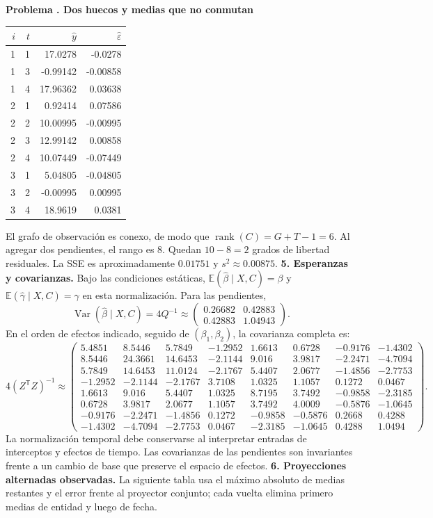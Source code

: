 \documentclass[11pt,a4paper]{article}
\newcommand{\E}{\mathbb E}
\newcommand{\T}{^{\mathsf T}}
\DeclareMathOperator{\Var}{Var}
\DeclareMathOperator{\rank}{rank}
\theoremstyle{definition}
\newcounter{problema}
\newenvironment{resuelto}[1]{\refstepcounter{problema}\par\medskip\Needspace{6\baselineskip}\textbf{Problema \theproblema. #1}\par}{\par\medskip}
\newcommand{\eps}{\varepsilon}
\begin{document}
\begin{resuelto}{Dos huecos y medias que no conmutan}
\begin{center}\small
\begin{tabular}{rrrr}
\toprule
$i$&$t$&$\widehat y$&$\widehat\eps$\\
\midrule
1&1&17.0278&-0.0278\\
1&3&-0.99142&-0.00858\\
1&4&17.96362&0.03638\\
2&1&0.92414&0.07586\\
2&2&10.00995&-0.00995\\
2&3&12.99142&0.00858\\
2&4&10.07449&-0.07449\\
3&1&5.04805&-0.04805\\
3&2&-0.00995&0.00995\\
3&4&18.9619&0.0381\\
\bottomrule
\end{tabular}
\end{center}
El grafo de observación es conexo, de modo que $\rank(C)=G+T-1=6$. Al agregar dos pendientes, el rango es $8$. Quedan $10-8=2$ grados de libertad residuales. La SSE es aproximadamente $0.01751$ y $s^2\approx0.00875$.
\textbf{5. Esperanzas y covarianzas.} Bajo las condiciones estáticas, $\E(\widehat\beta\mid X,C)=\beta$ y $\E(\widehat\gamma\mid X,C)=\gamma$ en esta normalización. Para las pendientes,
\[
\Var(\widehat\beta\mid X,C)=4Q^{-1}\approx\begin{pmatrix}
0.26682&0.42883\\0.42883&1.04943
\end{pmatrix}.
\]
En el orden de efectos indicado, seguido de $(\beta_1,\beta_2)$, la covarianza completa es:
{\small
\[
4(Z\T Z)^{-1}\approx\begin{pmatrix}
5.4851&8.5446&5.7849&-1.2952&1.6613&0.6728&-0.9176&-1.4302\\8.5446&24.3661&14.6453&-2.1144&9.016&3.9817&-2.2471&-4.7094\\5.7849&14.6453&11.0124&-2.1767&5.4407&2.0677&-1.4856&-2.7753\\-1.2952&-2.1144&-2.1767&3.7108&1.0325&1.1057&0.1272&0.0467\\1.6613&9.016&5.4407&1.0325&8.7195&3.7492&-0.9858&-2.3185\\0.6728&3.9817&2.0677&1.1057&3.7492&4.0009&-0.5876&-1.0645\\-0.9176&-2.2471&-1.4856&0.1272&-0.9858&-0.5876&0.2668&0.4288\\-1.4302&-4.7094&-2.7753&0.0467&-2.3185&-1.0645&0.4288&1.0494
\end{pmatrix}.
\]
}
La normalización temporal debe conservarse al interpretar entradas de interceptos y efectos de tiempo. Las covarianzas de las pendientes son invariantes frente a un cambio de base que preserve el espacio de efectos.
\textbf{6. Proyecciones alternadas observadas.} La siguiente tabla usa el máximo absoluto de medias restantes y el error frente al proyector conjunto; cada vuelta elimina primero medias de entidad y luego de fecha.


\end{resuelto}
\end{document}
